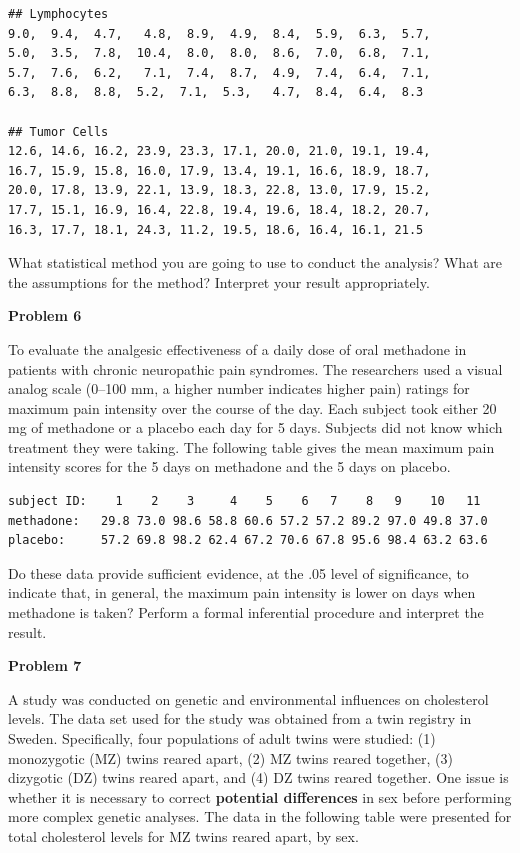 \documentclass[
]{book}
\begin{document}
\begin{verbatim}
## Lymphocytes
9.0,  9.4,  4.7,   4.8,  8.9,  4.9,  8.4,  5.9,  6.3,  5.7,  
5.0,  3.5,  7.8,  10.4,  8.0,  8.0,  8.6,  7.0,  6.8,  7.1,   
5.7,  7.6,  6.2,   7.1,  7.4,  8.7,  4.9,  7.4,  6.4,  7.1,  
6.3,  8.8,  8.8,  5.2,  7.1,  5.3,   4.7,  8.4,  6.4,  8.3

## Tumor Cells
12.6, 14.6, 16.2, 23.9, 23.3, 17.1, 20.0, 21.0, 19.1, 19.4,
16.7, 15.9, 15.8, 16.0, 17.9, 13.4, 19.1, 16.6, 18.9, 18.7,
20.0, 17.8, 13.9, 22.1, 13.9, 18.3, 22.8, 13.0, 17.9, 15.2,
17.7, 15.1, 16.9, 16.4, 22.8, 19.4, 19.6, 18.4, 18.2, 20.7,
16.3, 17.7, 18.1, 24.3, 11.2, 19.5, 18.6, 16.4, 16.1, 21.5
\end{verbatim}

What statistical method you are going to use to conduct the analysis? What are the assumptions for the method? Interpret your result appropriately.

\textbf{Problem 6}

To evaluate the analgesic effectiveness of a daily dose of oral methadone in patients with chronic neuropathic pain syndromes. The researchers used a visual analog scale (0--100 mm, a higher number indicates higher pain) ratings for maximum pain intensity over the course of the day. Each subject took either 20 mg of methadone or a placebo each day for 5 days. Subjects did not know which treatment they were taking. The following table gives the mean maximum pain intensity scores for the 5 days on methadone and the 5 days on placebo.

\begin{verbatim}
subject ID:    1    2    3     4    5    6   7    8   9    10   11
methadone:   29.8 73.0 98.6 58.8 60.6 57.2 57.2 89.2 97.0 49.8 37.0
placebo:     57.2 69.8 98.2 62.4 67.2 70.6 67.8 95.6 98.4 63.2 63.6
\end{verbatim}

Do these data provide sufficient evidence, at the .05 level of significance, to indicate that, in general, the maximum pain intensity is lower on days when methadone is taken? Perform a formal inferential procedure and interpret the result.

\textbf{Problem 7}

A study was conducted on genetic and environmental influences on cholesterol levels. The data set used for the study was obtained from a twin registry in Sweden. Specifically, four populations of adult twins were studied: (1) monozygotic (MZ) twins reared apart, (2) MZ twins reared together, (3) dizygotic (DZ) twins reared apart, and (4) DZ twins reared together. One issue is whether it is necessary to correct \textbf{potential differences} in sex before performing more complex genetic analyses. The data in the following table were presented for total cholesterol levels for MZ twins reared apart, by sex.
\end{document}
